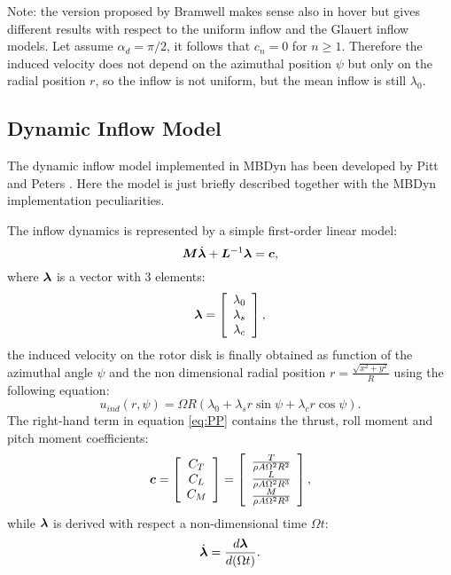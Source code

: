 Note: the version proposed by Bramwell \cite{BRAMWELL-1976}
makes sense also in hover but gives different
results with respect to the uniform inflow and the Glauert inflow models.
Let assume $\alpha_d = \pi/2$, it follows that $c_n = 0$ for $n \ge 1$.
Therefore the induced velocity does not depend on the azimuthal position 
$\psi$ but only on the radial position $r$, so the inflow is not uniform, 
but the mean inflow is still $\lambda_0$.

\subsection{Dynamic Inflow Model}

The dynamic inflow model implemented in MBDyn has been developed by Pitt
and Peters \cite{PITT}. 
Here the model is just briefly described together with the MBDyn implementation
peculiarities. 

The inflow dynamics is represented by a simple first-order linear model: 
\begin{equation}\label{eq:PP}
\bm{M} \dot{\bm{\lambda}} + \bm{L}^{-1} \bm{\lambda} =
 \bm{c},
\end{equation}
where $\bm{\lambda}$ is a vector with 3 elements:
\begin{equation}
\bm{\lambda} = 
\left[ 
\begin{array}{c}
\lambda_0 \\
\lambda_s \\
\lambda_c
\end{array}
\right],
\end{equation}
the induced velocity on the rotor disk is finally obtained as 
function of the azimuthal angle $\psi$ and the non dimensional
radial position $r = \frac{\sqrt{x^2 + y^2}}{R}$ using the
following equation:
\begin{equation}
u_{ind}(r, \psi) = \Omega R ( \lambda_0 + \lambda_s r \sin{\psi} +
\lambda_c r \cos{\psi} ).
\end{equation}
The right-hand term in equation \ref{eq:PP} contains the thrust,
roll moment and pitch moment coefficients:
\begin{equation}
\bm{c} = \left[
\begin{array}{c}
C_T \\
C_L \\
C_M 
\end{array}
\right] = \left[
\begin{array}{c}
\frac{T}{\rho A \Omega^2 R^2} \\
\frac{L}{\rho A \Omega^2 R^3} \\
\frac{M}{\rho A \Omega^2 R^3} 
\end{array}
\right],
\end{equation}
while $\bm{\lambda}$ is derived with respect a non-dimensional
time $\Omega t$:
\begin{equation}
\dot{\bm{\lambda}} = \frac{ d \bm{\lambda}}{ d (\Omega t)}.
\end{equation}

